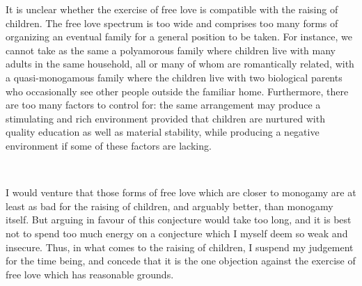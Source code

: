 \documentclass[a4paper, 12pt]{article}
\begin{document}
It is unclear whether the exercise of free love is compatible with the raising
of children. The free love spectrum is too wide and comprises too many forms of
organizing an eventual family for a general position to be taken. For
instance, we cannot take as the same a polyamorous family where children live
with many adults in the same household, all or many of whom are romantically
related, with a quasi-monogamous family where the children live with two
biological parents who occasionally see other people outside the familiar home.
Furthermore, there are too many factors to control for: the same arrangement
may produce a stimulating and rich environment provided that children are
nurtured with quality education as well as material stability, while producing
a negative environment if some of these factors are lacking.

~

I would venture that those forms of free love which are closer to
monogamy are at least as bad for the raising of children, and arguably better,
than monogamy itself. But arguing in favour of this conjecture would take too
long, and it is best not to spend too much energy on a conjecture which I
myself deem so weak and insecure. Thus, in what comes to the raising of children,
I suspend my judgement for the time being, and concede that it is the one objection 
against the exercise of free love which has reasonable grounds.
\end{document}
